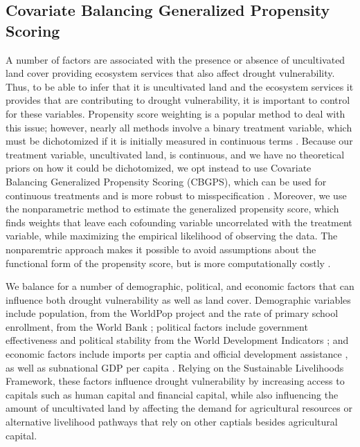 \documentclass{article}
\begin{document}
\subsection{Covariate Balancing Generalized Propensity Scoring}
A number of factors are associated with the presence or absence of uncultivated land cover providing ecosystem services that also affect drought vulnerability.  Thus, to be able to infer that it is uncultivated land and the ecosystem services it provides that are contributing to drought vulnerability, it is important to control for these variables.  Propensity score weighting is a popular method to deal with this issue; however, nearly all methods involve a binary treatment variable, which must be dichotomized if it is initially measured in continuous terms \cite{Hirano2003, Robins2000}.  Because our treatment variable, uncultivated land, is continuous, and we have no theoretical priors on how it could be dichotomized, we opt instead to use Covariate Balancing Generalized Propensity Scoring (CBGPS), which can be used for continuous treatments and is more robust to misspecification \cite{Fong2018}.  Moreover, we use the nonparametric method to estimate the generalized propensity score, which finds weights that leave each cofounding variable uncorrelated with the treatment variable, while maximizing the empirical likelihood of observing the data.  The nonparemtric approach makes it possible to avoid assumptions about the functional form of the propensity score, but is more computationally costly \cite{Fong2018}.

We balance for a number of demographic, political, and economic factors that can influence both drought vulnerability as well as land cover.  Demographic variables include population, from the WorldPop project \cite{Tatem2017} and the rate of primary school enrollment, from the World Bank \cite{TheWorldBank2019}; political factors include government effectiveness and political stability from the World Development Indicators \cite{WorldBank2017}; and economic factors include imports per captia and official development assistance \cite{TheWorldBank2019}, as well as subnational GDP per capita \cite{Kummu2018}.  Relying on the Sustainable Livelihoods Framework, these factors influence drought vulnerability by increasing access to capitals such as human capital and financial capital, while also influencing the amount of uncultivated land by affecting the demand for agricultural resources or alternative livelihood pathways that rely on other captials besides agricultural capital.
\end{document}
